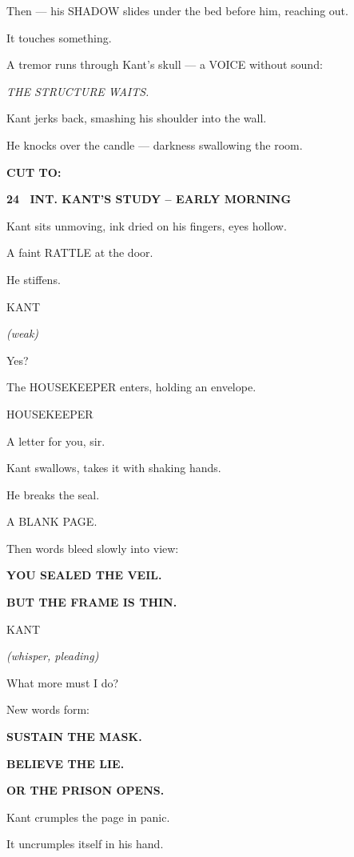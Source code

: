 \documentclass[12pt]{article}
\newcommand{\scene}[2]{%
  \vspace{1.8\baselineskip}%
  \noindent\textbf{#1 \ #2}\par\vspace{0.4\baselineskip}%
}
\newenvironment{dialogue}[1]{%
  \vspace{0.8\baselineskip}%
  \noindent\hspace*{2.3in}\textsc{#1}\par%
  \noindent\hspace*{1.5in}\begin{minipage}[t]{4.5in}%
}{%
  \end{minipage}\par%
}
\newcommand{\paren}[1]{%
  \noindent\hspace*{1.8in}\textit{(#1)}\par%
}
\newcommand{\transition}[1]{%
  \vspace{0.6\baselineskip}%
  \begin{flushright}\textbf{#1}\end{flushright}%
}
\newcommand{\centered}[1]{%
  \vspace{0.8\baselineskip}%
  \begin{center}#1\end{center}%
}
\begin{document}
Then — his SHADOW slides under the bed before him, reaching out.

It touches something.

A tremor runs through Kant’s skull — a VOICE without sound:

\emph{THE STRUCTURE WAITS.}

Kant jerks back, smashing his shoulder into the wall.

He knocks over the candle — darkness swallowing the room.

\transition{CUT TO:}


\scene{24}{INT. KANT'S STUDY -- EARLY MORNING}

Kant sits unmoving, ink dried on his fingers, eyes hollow.

A faint RATTLE at the door.

He stiffens.

\begin{dialogue}{KANT}
\paren{weak}
Yes?
\end{dialogue}

The HOUSEKEEPER enters, holding an envelope.

\begin{dialogue}{HOUSEKEEPER}
A letter for you, sir.
\end{dialogue}

Kant swallows, takes it with shaking hands.

He breaks the seal.

A BLANK PAGE.

Then words bleed slowly into view:

\centered{\textbf{YOU SEALED THE VEIL.}}

\centered{\textbf{BUT THE FRAME IS THIN.}}

\begin{dialogue}{KANT}
\paren{whisper, pleading}
What more must I do?
\end{dialogue}

New words form:

\centered{\textbf{SUSTAIN THE MASK.}}

\centered{\textbf{BELIEVE THE LIE.}}

\centered{\textbf{OR THE PRISON OPENS.}}

Kant crumples the page in panic.

It uncrumples itself in his hand.
\end{document}
